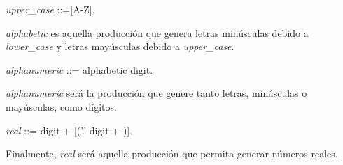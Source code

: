 \documentclass[12pt]{article}
\begin{document}
\noindent \textit{upper\_case} ::=[A-Z].

\textit{alphabetic} es aquella producción que genera letras minúsculas debido a \textit{lower\_case} y letras mayúsculas debido a \textit{upper\_case}.

\noindent \textit{alphanumeric} ::= alphabetic \textbar digit.

\textit{alphanumeric} será la producción que genere tanto letras, minúsculas o mayúsculas, como dígitos.

\noindent \textit{real} ::= digit + [('.' digit + )].

Finalmente, \textit{real} será aquella producción que permita generar números reales.

\newpage


\end{document}
